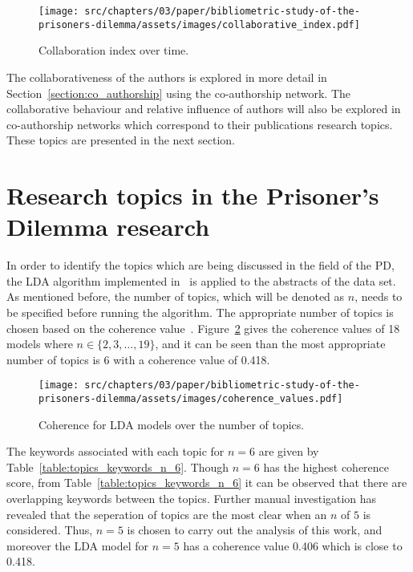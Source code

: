 \begin{figure}[!hbtp]
    \centering
    \texttt{[image: src/chapters/03/paper/bibliometric-study-of-the-prisoners-dilemma/assets/images/collaborative\_index.pdf]}
    \caption{Collaboration index over time.}\label{fig:ci_over_time}
\end{figure}

The collaborativeness of the authors is explored in more detail in
Section~\ref{section:co_authorship} using the co-authorship network. The
collaborative behaviour and relative influence of authors will also be explored
in co-authorship networks which correspond to their publications research topics.
These topics are presented in the next section.

\section{Research topics in the Prisoner's Dilemma research}\label{section:topics}

In order to identify the topics which are being discussed in the field of the
PD, the LDA algorithm implemented in~\cite{rehurek_lrec} is applied to the
abstracts of the data set. As mentioned before, the number of topics, which
will be denoted as \(n\), needs to be specified before running the algorithm.
The appropriate number of topics is chosen based on the coherence
value~\cite{Roder2015}. Figure~\ref{fig:coherence_value_over_number_of_topcis}
gives the coherence values of 18 models where \(n \in \{2, 3, \dots, 19\}\), and
it can be seen than the most appropriate number of topics is 6 with a coherence
value of 0.418.

\begin{figure}[!hbtp]
    \centering
    \texttt{[image: src/chapters/03/paper/bibliometric-study-of-the-prisoners-dilemma/assets/images/coherence\_values.pdf]}
    \caption{Coherence for LDA models over the number of topics.}
    \label{fig:coherence_value_over_number_of_topcis}
\end{figure}

The keywords associated with each topic for \(n=6\) are given by
Table~\ref{table:topics_keywords_n_6}. Though \(n=6\) has the highest coherence
score, from Table~\ref{table:topics_keywords_n_6} it can be observed that there
are overlapping keywords between the topics. Further manual investigation has
revealed that the seperation of topics are the most clear when an \(n\) of \(5\)
is considered. Thus, \(n=5\) is chosen to carry out the analysis of this work,
and moreover the LDA model for \(n=5\) has a coherence value 0.406 which is
close to 0.418.


